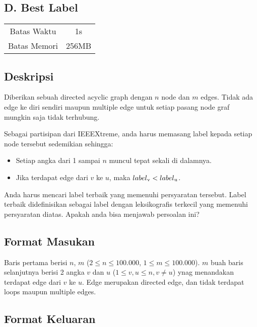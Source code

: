 \documentclass{article}
\begin{document}
\begin{center}
    \section*{D. Best Label}

    \begin{tabular}{ | c c | }
        \hline
        Batas Waktu  & 1s \\  
        Batas Memori & 256MB \\
        \hline
    \end{tabular}
\end{center}

\subsection*{Deskripsi}

Diberikan sebuah directed acyclic graph dengan $n$ node dan $m$ edges.
Tidak ada edge ke diri sendiri maupun multiple edge untuk setiap pasang node
graf mungkin saja tidak terhubung.

Sebagai partisipan dari IEEEXtreme, anda harus memasang label kepada setiap node tersebut sedemikian sehingga:

\begin{itemize}
    \setlength\itemsep{0pt}
    \item Setiap angka dari 1 sampai $n$ muncul tepat sekali di dalamnya.
    \item Jika terdapat edge dari $v$ ke $u$, maka $label\textsubscript{v} < label\textsubscript{u}$.
\end{itemize}

Anda harus mencari label terbaik yang memenuhi persyaratan tersebut.
Label terbaik didefinisikan sebagai label dengan leksikografis terkecil yang memenuhi persyaratan diatas.
Apakah anda bisa menjawab persoalan ini?

\subsection*{Format Masukan}

Baris pertama berisi $n$, $m$ ($2 \leq n \leq 100.000$, $1 \leq m \leq 100.000$).
$m$ buah baris selanjutnya berisi 2 angka $v$ dan $u$ ($1 \leq v, u \leq n, v \neq u$) ynag menandakan terdapat edge dari $v$ ke $u$.
Edge merupakan directed edge, dan tidak terdapat loops maupun multiple edges.

\subsection*{Format Keluaran}
\end{document}
